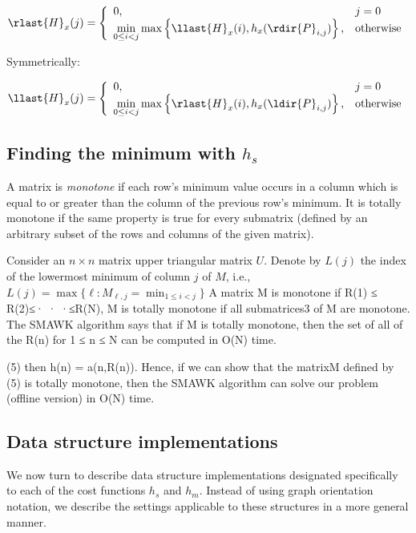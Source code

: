 \begin{equation}\label{eq:Hr}
\rlast{H}_x(j) = \left\{\begin{array}{ll}
0, & j = 0\\
\min\limits_{0 \leq i < j}\max\left\{\llast{H}_x(i), h_x(\rdir{P}_{i, j})\right\}, & \text{otherwise}\\
\end{array}\right.
\end{equation}

Symmetrically: 

\begin{equation}\label{eq:Hl}
\llast{H}_x(j) = \left\{\begin{array}{ll}
0, & j = 0\\
\min\limits_{0 \leq i < j}\max\left\{\rlast{H}_x(i), h_x(\ldir{P}_{i, j})\right\}, & \text{otherwise}\\
\end{array}\right.
\end{equation}

\subsection{Finding the minimum with $h_s$}
\begin{definition}
A matrix is \emph{monotone} if each row's minimum value occurs in a column which is equal to or greater than the column of the previous row's minimum. It is totally monotone if the same property is true for every submatrix (defined by an arbitrary subset of the rows and columns of the given matrix). 
\end{definition}
Consider an $n\times n$ matrix upper triangular matrix $U$. Denote
by $L(j)$ the index of the lowermost minimum of column $j$ of $M$, i.e.,
$L(j) = \max\{\ell :M_{\ell,j}= \min_{1\leq i<j}\}$
A matrix M is monotone if R(1) ≤ R(2)≤· · ·≤R(N), M is totally monotone if all
submatrices3 of M are monotone. The SMAWK algorithm says that if M is totally
monotone, then the set of all of the R(n) for 1 ≤ n ≤ N can be computed in O(N)
time.

(5)
then h(n) = a(n,R(n)). Hence, if we can show that the matrixM defined by (5) is totally
monotone, then the SMAWK algorithm can solve our problem (offline version)
in O(N) time.

\subsection{Data structure implementations}
We now turn to describe data structure implementations designated specifically to each of the cost functions $h_s$ and $h_m$. Instead of using graph orientation notation, we describe the settings applicable to these structures in a more general manner.

